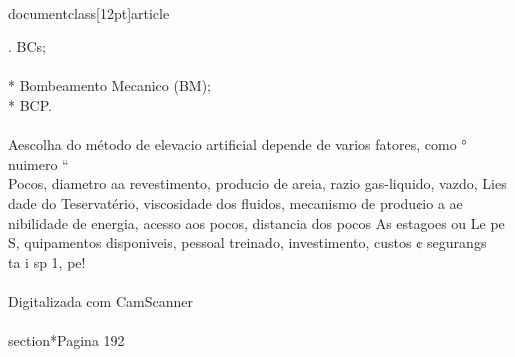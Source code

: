 \\documentclass[12pt]{article}
\begin{document}
. BCs;\\
\\
* Bombeamento Mecanico (BM);\\
* BCP.\\
\\
Aescolha do método de elevacio artificial depende de varios fatores, como ° nuimero “\\
Pocos, diametro aa revestimento, producio de areia, razio gas-liquido, vazdo, Lies\\
dade do Teservatério, viscosidade dos fluidos, mecanismo de produ¢io a ae\\
nibilidade de energia, acesso aos pocos, distancia dos pocos As estagoes ou Le pe\\
S, quipamentos disponiveis, pessoal treinado, investimento, custos ¢ segurangs\\
ta i sp 1, pe!\\
\\
Digitalizada com CamScanner\\

\\section*{Pagina 192}
\end{document}
